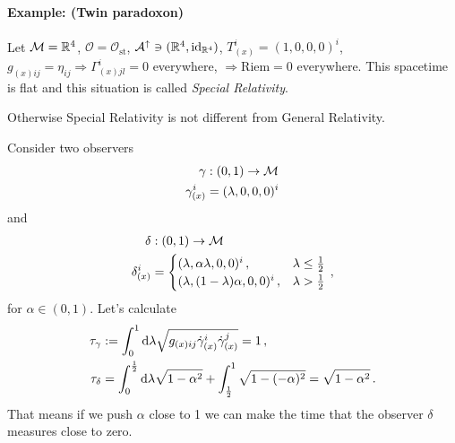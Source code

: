 \documentclass[11pt, a4paper, twocolumn]{article} %
\begin{document}
    \paragraph{Example: (Twin paradoxon)}
    Let $\mathcal{M} = \mathbb{R}^4$, $\mathcal{O} = \mathcal{O}_\text{st}$, 
    $\mathcal{A}^\uparrow \ni (\mathbb{R}^4, \mathrm{id}_{\mathbb{R}^4})$, $T^i_{(x)} = (1,0,0,0)^i$,
    $g_{(x)ij} = \eta_{ij} \Rightarrow \Gamma^i_{(x)jl}=0$ everywhere,
    $\Rightarrow \mathrm{Riem}=0$ everywhere.
    This spacetime is flat and this situation is called \textit{Special Relativity}.
    \begin{note}
        Otherwise Special Relativity is not different from General Relativity.
    \end{note}
    Consider two observers
    \begin{align}
        \gamma&: (0,1)\to \mathcal{M}\\
        \gamma_{(x)}^i &= (\lambda, 0,0,0)^i
    \end{align}
    and
    \begin{align}
        \delta&:(0,1)\to\mathcal{M}\\
        \delta_{(x)}^i &=
        \begin{cases}
            (\lambda, \alpha \lambda, 0,0)^i\,,& \lambda \leq \frac{1}{2}\\
            (\lambda, (1-\lambda) \alpha , 0,0)^i\,,& \lambda > \frac{1}{2}\\
        \end{cases}\,,
    \end{align}
    for $\alpha\in(0,1)$.
    Let's calculate
    \begin{align}
        \tau_\gamma &:= \int_0^1 \operatorname{d\!} \lambda \sqrt{g_{(x)ij}\dot{\gamma}^i_{(x)}\dot{\gamma}^j_{(x)}} = 1\,,\\
        \tau_\delta &= \int_0^{\frac{1}{2}}\operatorname{d\!} \lambda \sqrt{1 - \alpha^2} + \int_{\frac{1}{2}}^1 \sqrt{1 - (-\alpha)^2}
        = \sqrt{1 - \alpha^2}\,.
    \end{align}
    That means if we push $\alpha$ close to 1 we can make the time that the observer
    $\delta$ measures close to zero.
    
\end{document}

